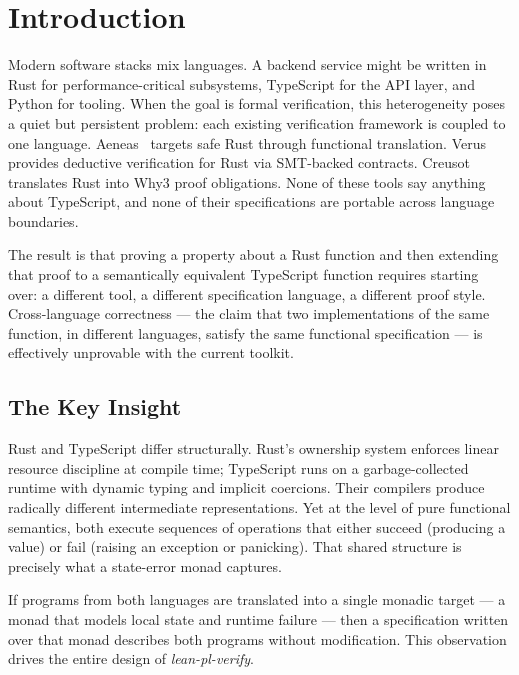 
\section{Introduction}
\label{sec:intro}

Modern software stacks mix languages. A backend service might be written in
Rust for performance-critical subsystems, TypeScript for the API layer, and
Python for tooling. When the goal is formal verification, this heterogeneity
poses a quiet but persistent problem: each existing verification framework is
coupled to one language. Aeneas~\cite{ho2022aeneas} targets safe Rust through
functional translation. Verus~\cite{verus2023} provides deductive verification
for Rust via SMT-backed contracts. Creusot~\cite{creusot2022} translates Rust
into Why3 proof obligations. None of these tools say anything about TypeScript,
and none of their specifications are portable across language boundaries.

The result is that proving a property about a Rust function and then extending
that proof to a semantically equivalent TypeScript function requires starting
over: a different tool, a different specification language, a different proof
style. Cross-language correctness — the claim that two implementations of the
same function, in different languages, satisfy the same functional
specification — is effectively unprovable with the current toolkit.

\subsection{The Key Insight}

Rust and TypeScript differ structurally. Rust's ownership system enforces
linear resource discipline at compile time; TypeScript runs on a garbage-collected
runtime with dynamic typing and implicit coercions. Their compilers produce
radically different intermediate representations. Yet at the level of pure
functional semantics, both execute sequences of operations that either
succeed (producing a value) or fail (raising an exception or panicking). That
shared structure is precisely what a state-error monad captures.

If programs from both languages are translated into a single monadic target —
a monad that models local state and runtime failure — then a specification
written over that monad describes both programs without modification. This
observation drives the entire design of \emph{lean-pl-verify}.


